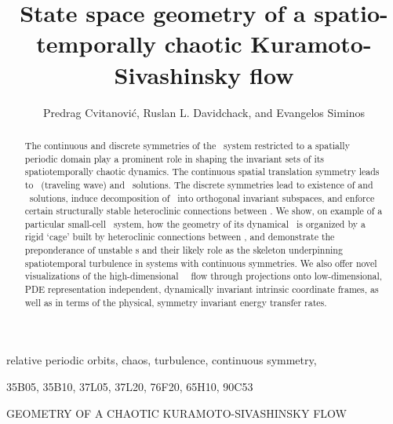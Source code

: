 \documentclass[final]{siamltex}
\begin{document}
                \title{
State space geometry of a spatio-temporally chaotic
Kuramoto-Sivashinsky flow
                 }
                  \author{
Predrag Cvitanovi\'c\footnotemark[1],
Ruslan L. Davidchack\footnotemark[2],
    and
Evangelos Siminos\footnotemark[1]
                    }

                \maketitle

\renewcommand{\thefootnote}{\fnsymbol{footnote}}
\renewcommand{\thefootnote}{\arabic{footnote}}

                \begin{abstract}
The continuous and discrete symmetries of the \KS\ system
restricted to a spatially periodic domain play a prominent
role in shaping the invariant sets of its
spatiotemporally chaotic dynamics.
The continuous spatial
translation symmetry leads to
\reqva\ (traveling wave) and \rpo\ solutions.
The discrete symmetries lead to existence of
{\eqv} and \po\ solutions,
induce decomposition
of \statesp\ into orthogonal invariant subspaces, and
enforce certain
structurally stable heteroclinic connections between \eqva.
We show, on example of a particular small-cell \KS\ system,
how the geometry of its dynamical \statesp\ is organized by a rigid
`cage' built by heteroclinic connections between \eqva, 
and demonstrate the preponderance of unstable \rpo s and their likely
role as the skeleton underpinning spatiotemporal turbulence in systems
with continuous symmetries.
We also offer novel visualizations of the high-dimensional
\KS\ \statesp\ flow
through projections onto low-dimensional,
PDE representation independent,
dynamically invariant intrinsic coordinate frames,
as well as in terms of the physical, symmetry invariant
energy transfer rates.
                \end{abstract}

\begin{keywords}
relative periodic orbits, chaos, turbulence, continuous symmetry, {\KSe}
\end{keywords}

\begin{AMS}
35B05, 35B10, 37L05, 37L20, 76F20, 65H10, 90C53
\end{AMS}

\pagestyle{myheadings}
\thispagestyle{plain}
         {GEOMETRY OF A CHAOTIC KURAMOTO-SIVASHINSKY FLOW}








\appendix






\end{document}
